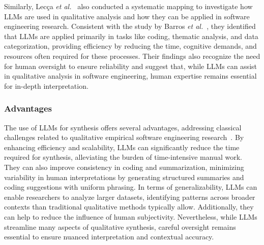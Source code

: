 Similarly, Lecça \textit{et al.}~\cite{leça2024applicationsimplicationslargelanguage} also conducted a systematic mapping to investigate how LLMs are used in qualitative analysis and how they can be applied in software engineering research. Consistent with the study by Barros \textit{et al.}~\cite{barros2024largelanguagemodelqualitative}, they identified that LLMs are applied primarily in tasks like coding, thematic analysis, and data categorization, providing efficiency by reducing the time, cognitive demands, and resources often required for these processes. Their findings also recognize the need for human oversight to ensure reliability and suggest that, while LLMs can assist in qualitative analysis in software engineering, human expertise remains essential for in-depth interpretation.

\subsubsection{Advantages}

The use of LLMs for synthesis offers several advantages, addressing classical challenges related to qualitative empirical software engineering research~\cite{DBLP:journals/ase/BanoHZT24, barros2024largelanguagemodelqualitative, leça2024applicationsimplicationslargelanguage}. By enhancing efficiency and scalability, LLMs can significantly reduce the time required for synthesis, alleviating the burden of time-intensive manual work. They can also improve consistency in coding and summarization, minimizing variability in human interpretations by generating structured summaries and coding suggestions with uniform phrasing. In terms of generalizability, LLMs can enable researchers to analyze larger datasets, identifying patterns across broader contexts than traditional qualitative methods typically allow. Additionally, they can help to reduce the influence of human subjectivity. Nevertheless, while LLMs streamline many aspects of qualitative synthesis, careful oversight remains essential to ensure nuanced interpretation and contextual accuracy.


